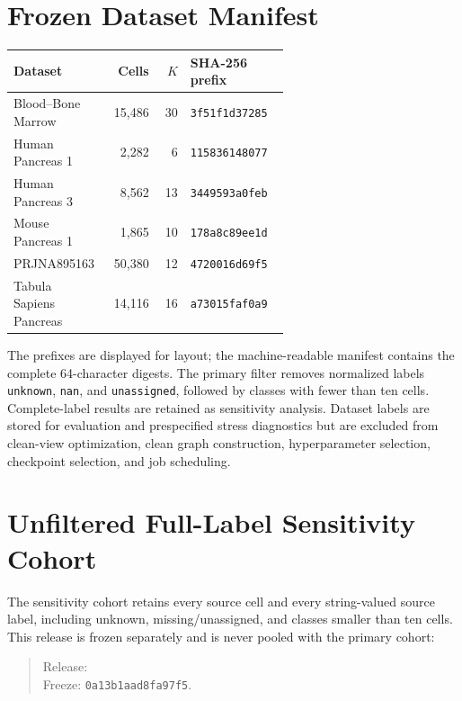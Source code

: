 \documentclass[11pt]{article}
\begin{document}


\section{Frozen Dataset Manifest}

\begin{longtable}{p{0.25\linewidth}rrp{0.36\linewidth}}
\toprule
Dataset & Cells & $K$ & SHA-256 prefix\\
\midrule
\endhead
Blood--Bone Marrow & 15,486 & 30 &
\texttt{3f51f1d37285}\\
Human Pancreas 1 & 2,282 & 6 &
\texttt{115836148077}\\
Human Pancreas 3 & 8,562 & 13 &
\texttt{3449593a0feb}\\
Mouse Pancreas 1 & 1,865 & 10 &
\texttt{178a8c89ee1d}\\
PRJNA895163 & 50,380 & 12 &
\texttt{4720016d69f5}\\
Tabula Sapiens Pancreas & 14,116 & 16 &
\texttt{a73015faf0a9}\\
\bottomrule
\end{longtable}

The prefixes are displayed for layout; the machine-readable manifest contains
the complete 64-character digests.  The primary filter removes normalized labels \texttt{unknown}, \texttt{nan},
and \texttt{unassigned}, followed by classes with fewer than ten cells.
Complete-label results are retained as sensitivity analysis.  Dataset labels
are stored for evaluation and prespecified stress diagnostics but are excluded
from clean-view optimization, clean graph construction, hyperparameter
selection, checkpoint selection, and job scheduling.

\section{Unfiltered Full-Label Sensitivity Cohort}

The sensitivity cohort retains every source cell and every string-valued source
label, including unknown, missing/unassigned, and classes smaller than ten
cells.  This release is frozen separately and is never pooled with the primary
cohort:
\begin{quote}\small
Release: \\
Freeze: \texttt{0a13b1aad8fa97f5}.
\end{quote}
\end{document}
